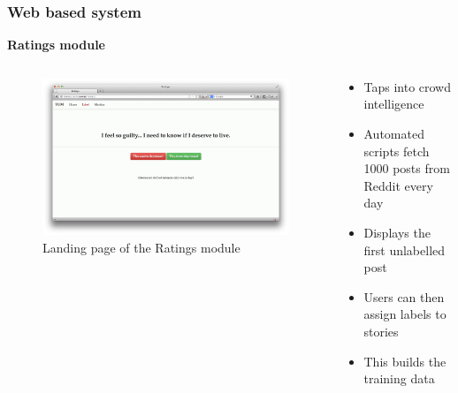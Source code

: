 \documentclass{beamer}
\begin{document}
    \begin{frame}
        \frametitle{Web based system}
        \begin{center}
            \textbf{Ratings module}
        \end{center}
        \begin{columns}
            \begin{column}{0.5\textwidth}
                \begin{figure}
                    \centering
                    \includegraphics[width=\textwidth]{figures/ratings.png}
                    \caption{Landing page of the Ratings module}
                \end{figure}
            \end{column}
            \begin{column}{0.5\textwidth}
                \begin{itemize}
                    \item{Taps into crowd intelligence}
                    \item{Automated scripts fetch 1000 posts from Reddit every day}
                    \item{Displays the first unlabelled post}
                    \item{Users can then assign labels to stories}
                    \item{This builds the training data}
                \end{itemize}
            \end{column}
        \end{columns}
    \end{frame}
    
\end{document}
